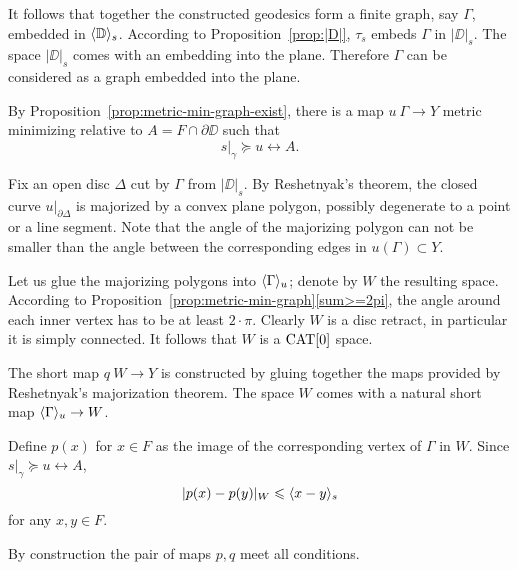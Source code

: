 
It follows that together the constructed geodesics form a finite graph, say $\Gamma$,
embedded in $\langle\mathbb{D}\rangle_s$.
According to Proposition~\ref{prop:|D|},
 $\tau_s$ embeds $\Gamma$ in $|\DD|_s$.
The space $|\DD|_s$ comes with an embedding into the plane.
Therefore $\Gamma$ can be considered as a graph embedded into the plane.

By Proposition~\ref{prop:metric-min-graph-exist}, there is a map 
$u\:\Gamma\to Y$ metric minimizing relative to $A=F\cap\partial\DD$ such that
\[s|_\gamma\succcurlyeq u\rel A.\]

Fix an open disc $\Delta$ cut by $\Gamma$ from $|\DD|_s$.
By Reshetnyak's theorem, the closed curve $u|_{\partial\Delta}$
is majorized by a convex plane polygon, possibly degenerate to a point or a line segment.
Note that the angle of the majorizing polygon can not be smaller than the angle between the corresponding edges in $u(\Gamma)\subset Y$.

Let us glue the majorizing polygons into $\langle\Gamma\rangle_u$;
denote by $W$ the resulting space.
According to Proposition~\ref{prop:metric-min-graph}\ref{sum>=2pi}, the angle around each inner vertex has to be at least $2\cdot\pi$.
Clearly $W$ is a disc retract, in particular it is simply connected.
It follows that $W$ is a $\mathop{\rm CAT}\nolimits[0]$ space.

The short map $q\:W\to Y$ is constructed by gluing together the maps provided by Reshetnyak's majorization theorem.
The space $W$ comes with a natural short map $\langle\Gamma\rangle_u\to W$.

Define $p(x)$ for $x\in F$ as the image of the corresponding vertex of $\Gamma$ in $W$.
Since $s|_\gamma\succcurlyeq u\rel A$, 
\[|p(x)-p(y)|_W\leqslant \langle x-y\rangle_s\]
for any $x,y\in F$.

By construction the pair of maps $p,q$ meet all conditions.
\qeds